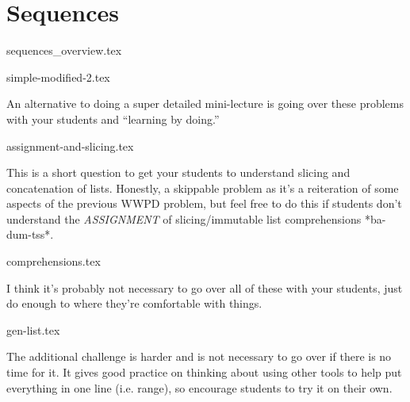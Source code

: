 \documentclass{exam}
\begin{document}
\section{Sequences}
{sequences_overview.tex}
\begin{questions}
    {simple-modified-2.tex}
    \begin{questionmeta}
        An alternative to doing a super detailed mini-lecture is going over these problems with your students and ``learning by doing.'' 
    \end{questionmeta}
    \newpage
    {assignment-and-slicing.tex}
    \begin{questionmeta}
        This is a short question to get your students to understand slicing and concatenation of lists. Honestly, a skippable problem as it's a reiteration of some aspects of the previous WWPD problem, but feel free to do this if students don't understand the \textit{ASSIGNMENT} of slicing/immutable list comprehensions *ba-dum-tss*.
    \end{questionmeta}
    {comprehensions.tex}
    \begin{questionmeta}
        I think it's probably not necessary to go over all of these with your students, just do enough to where they're comfortable with things. 
    \end{questionmeta}
        \newpage
    {gen-list.tex}
    \begin{questionmeta}
        The additional challenge is harder and is not necessary to go over if there is no time for it. It gives good practice on thinking about using other tools to help put everything in one line (i.e. range), so encourage students to try it on their own.
    \end{questionmeta}
\end{questions}
    \newpage
\end{document}
